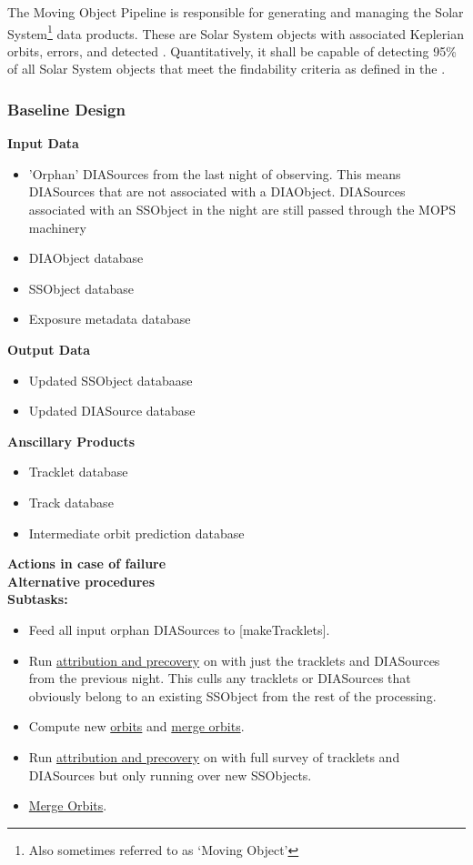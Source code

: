 The Moving Object Pipeline is responsible for generating and managing the Solar System\footnote{Also sometimes referred to as `Moving Object'} data products. These are Solar System objects with associated Keplerian orbits, errors, and detected \DIASources. Quantitatively, it shall be capable of detecting 95\% of all Solar System objects that meet the findability criteria as defined in the \OSS\@. 

\subsubsection{Baseline Design}
{\bf Input Data}\\
\begin{itemize}
\item 'Orphan' DIASources from the last night of observing.  This means DIASources that are not associated with a DIAObject.  DIASources associated with an SSObject in the night are still passed through the MOPS machinery
\item DIAObject database
\item SSObject database
\item Exposure metadata database
\end{itemize}
{\bf Output Data}\\
\begin{itemize}
\item Updated SSObject databaase
\item Updated DIASource database
\end{itemize}
{\bf Anscillary Products}\\
\begin{itemize}
\item Tracklet database
\item Track database
\item Intermediate orbit prediction database
\end{itemize}
{\bf Actions in case of failure}\\
{\bf Alternative procedures}\\

{\bf Subtasks:}
\begin{itemize}
\item Feed all input orphan DIASources to \hyperref[sec:acMakeTracklets][makeTracklets].
\item Run \hyperref[sec:acAttributionAndPrecovery]{attribution and precovery} on with just the tracklets and DIASources from the previous night.  This culls any tracklets or DIASources that obviously belong to an existing SSObject from the rest of the processing.
\item Compute new \hyperref[sec:acOrbitFitting]{orbits} and \hyperref[sec:acOrbitMerging]{merge orbits}.
\item Run \hyperref[sec:acAttributionAndPrecovery]{attribution and precovery} on with full survey of tracklets and DIASources but only running over new SSObjects.
\item \hyperref[sec:acOrbitMerging]{Merge Orbits}.
\end{itemize}


